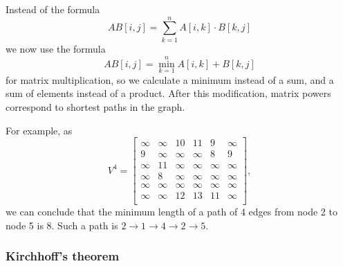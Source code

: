 Instead of the formula
\[
AB[i,j] = \sum_{k=1}^n A[i,k] \cdot B[k,j]
\]
we now use the formula
\[
AB[i,j] = \min_{k=1}^n A[i,k] + B[k,j]
\]
for matrix multiplication, so we calculate
a minimum instead of a sum,
and a sum of elements instead of a product.
After this modification,
matrix powers correspond to
shortest paths in the graph.

For example, as
\[
V^4= \begin{bmatrix}
  \infty & \infty & 10 & 11 & 9 & \infty \\
  9 & \infty & \infty & \infty & 8 & 9 \\
  \infty & 11 & \infty & \infty & \infty & \infty \\
  \infty & 8 & \infty & \infty & \infty & \infty \\
  \infty & \infty & \infty & \infty & \infty & \infty \\
  \infty & \infty & 12 & 13 & 11 & \infty \\
 \end{bmatrix},
\]
we can conclude that the minimum length of a path
of 4 edges
from node 2 to node 5 is 8.
Such a path is
$2 \rightarrow 1 \rightarrow 4 \rightarrow 2 \rightarrow 5$.

\subsubsection{Kirchhoff's theorem}


